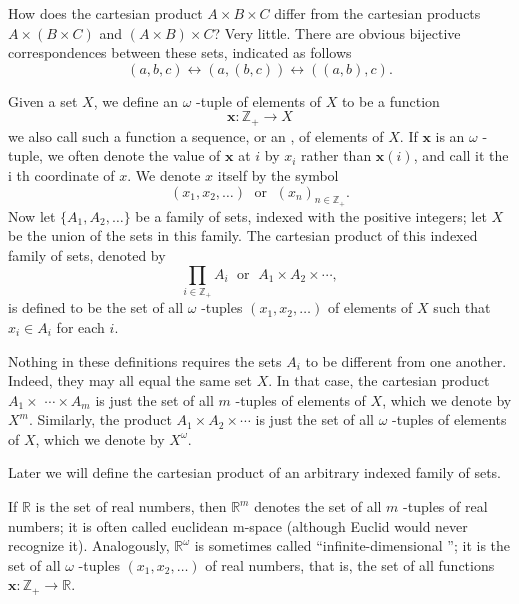 \begin{centeredblock}
 \begin{example}
\label{ex:\thesection.\theexample}
 How does the cartesian product \(A \times B \times C\) differ from the cartesian products \(A \times ({B \times C})\) and \(({A \times B}) \times C\)? Very little. There are obvious bijective correspondences between these sets, indicated as follows
 \[
 ({a,b,c}) \leftrightarrow ({a,({b,c}) }) \leftrightarrow ({({a,b}),c}).
 \]
 \end{example}
\end{centeredblock}

\begin{definition}
 Given a set \(X\), we define an \(\omega\) -tuple of elements of \(X\) to be a function
 \[
 \mathbf{x} : \mathbb{Z}_{+} \rightarrow X
 \]
 we also call such a function a sequence, or an , of elements of \(X\). If \(\mathbf{x}\) is an \(\omega\) -tuple, we often denote the value of \(\mathbf{x}\) at \(i\) by \(x_{i}\) rather than \(\mathbf{x}(i)\), and call it the i th coordinate of \(x\). We denote \(x\) itself by the symbol
 \[
 ({x_{1},x_{2},\ldots }) \;\text{ or }\;{(x_{n}) }_{n \in {\mathbb{Z}}_{+}}.
 \]
 Now let \(\{ {A_{1},A_{2},\ldots }\}\) be a family of sets, indexed with the positive integers; let \(X\) be the union of the sets in this family. The cartesian product of this indexed family of sets, denoted by
 \[
 \mathop{\prod }\limits_{{i \in {\mathbb{Z}}_{+}}}A_{i}\;\text{ or }\;A_{1} \times {A}_{2} \times \cdots ,
 \]
 is defined to be the set of all \(\omega\) -tuples \(({x_{1},x_{2},\ldots })\) of elements of \(X\) such that \(x_{i} \in {A}_{i}\) for each \(i\).
\end{definition}

Nothing in these definitions requires the sets \(A_{i}\) to be different from one another. 
Indeed, they may all equal the same set \(X\). In that case, 
the cartesian product \(A_{1} \times\) \(\cdots \times {A}_{m}\) 
is just the set of all \(m\) -tuples of elements of \(X\), which we denote by \(X^{m}\).
Similarly, the product \(A_{1} \times {A}_{2} \times \cdots\) is just the set 
of all \(\omega\) -tuples of elements of \(X\), which we denote by \(X^{\omega}\).

Later we will define the cartesian product of an arbitrary indexed family of sets.

\begin{centeredblock}
 \begin{example}
\label{ex:\thesection.\theexample}
 If \(\mathbb{R}\) is the set of real numbers, then \(\mathbb{R}^{m}\) denotes the set of all \(m\) -tuples of real numbers; it is often called euclidean m-space (although Euclid would never recognize it). Analogously, \(\mathbb{R}^{\omega }\) is sometimes called ``infinite-dimensional ''; it is the set of all \(\omega\) -tuples \(({x_{1},x_{2},\ldots })\) of real numbers, that is, the set of all functions \(\mathbf{x} : \mathbb{Z}_{+} \rightarrow \mathbb{R}\).
 \end{example}
\end{centeredblock}

